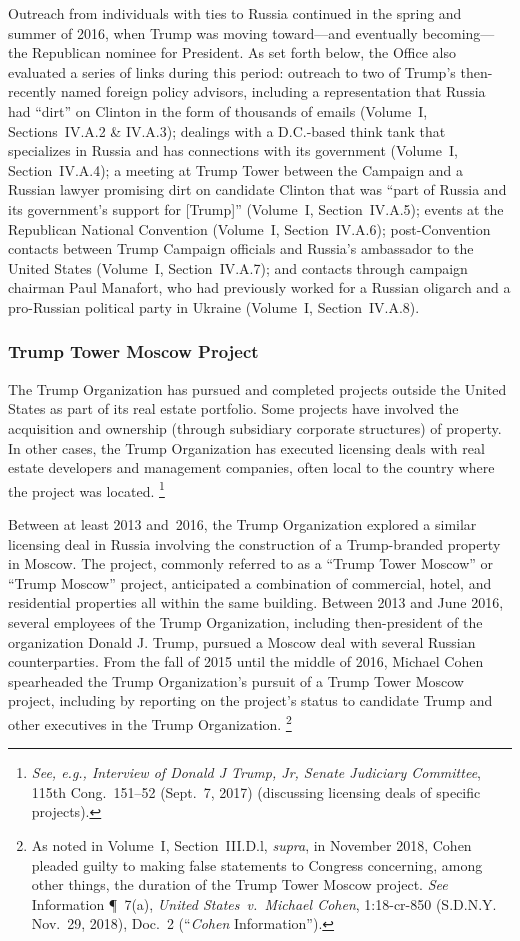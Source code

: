 Outreach from individuals with ties to Russia continued in the spring and summer of 2016, when Trump was moving toward---and eventually becoming---the Republican nominee for President.
As set forth below, the Office also evaluated a series of links during this period: outreach to two of Trump's then-recently named foreign policy advisors, including a representation that Russia had ``dirt'' on Clinton in the form of thousands of emails (Volume~I, Sections~IV.A.2 \& IV.A.3);
dealings with a D.C.-based think tank that specializes in Russia and has connections with its government (Volume~I, Section~IV.A.4);
a meeting at Trump Tower between the Campaign and a Russian lawyer promising dirt on candidate Clinton that was ``part of Russia and its government's support for [Trump]'' (Volume~I, Section~IV.A.5);
events at the Republican National Convention (Volume~I, Section~IV.A.6);
post-Convention contacts between Trump Campaign officials and Russia's ambassador to the United States (Volume~I, Section~IV.A.7);
and contacts through campaign chairman Paul Manafort, who had previously worked for a Russian oligarch and a pro-Russian political party in Ukraine (Volume~I, Section~IV.A.8).

\subsubsection{Trump Tower Moscow Project}

The Trump Organization has pursued and completed projects outside the United States as part of its real estate portfolio.
Some projects have involved the acquisition and ownership (through subsidiary corporate structures) of property.
In other cases, the Trump Organization has executed licensing deals with real estate developers and management companies, often local to the country where the project was located.%
\footnote{\textit{See, e.g., Interview of Donald J Trump, Jr, Senate Judiciary Committee}, 115th Cong.~151--52 (Sept.~7, 2017) (discussing licensing deals of specific projects).}

Between at least 2013 and~2016, the Trump Organization explored a similar licensing deal in Russia involving the construction of a Trump-branded property in Moscow.
The project, commonly referred to as a ``Trump Tower Moscow'' or ``Trump Moscow'' project, anticipated a combination of commercial, hotel, and residential properties all within the same building.
Between 2013 and June 2016, several employees of the Trump Organization, including then-president of the organization Donald J. Trump, pursued a Moscow deal with several Russian counterparties.
From the fall of 2015 until the middle of 2016, Michael Cohen spearheaded the Trump Organization's pursuit of a Trump Tower Moscow project, including by reporting on the project's status to candidate Trump and other executives in the Trump Organization.%
\footnote{As noted in Volume~I, Section~III.D.l, \textit{supra}, in November 2018, Cohen pleaded guilty to making false statements to Congress concerning, among other things, the duration of the Trump Tower Moscow project.
\textit{See} Information \P~7(a), \textit{United States~v.\ Michael Cohen}, 1:18-cr-850 (S.D.N.Y. Nov.~29, 2018), Doc.~2 (``\textit{Cohen} Information'').}

